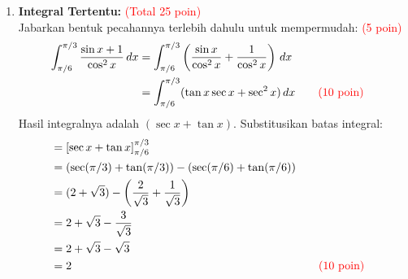 ﻿\documentclass[a4paper,12pt]{article}
\begin{document}
\begin{enumerate}
  \item \textbf{Integral Tertentu:} \textcolor{red}{(Total 25 poin)}\\
        Jabarkan bentuk pecahannya terlebih dahulu untuk mempermudah: \textcolor{red}{(5 poin)}
        \begin{align*}
          \int_{\pi/6}^{\pi/3} \frac{\sin x + 1}{\cos^2 x}\,dx & = \int_{\pi/6}^{\pi/3} \left( \frac{\sin x}{\cos^2 x} + \frac{1}{\cos^2 x} \right)\,dx                                               \\
                                                               & = \int_{\pi/6}^{\pi/3} (\tan x \sec x + \sec^2 x)\,dx                                  &  & \textcolor{red}{\quad (10 \text{ poin})}
        \end{align*}
        Hasil integralnya adalah $(\sec x + \tan x)$. Substitusikan batas integral:
        \begin{align*}
           & = \left[ \sec x + \tan x \right]_{\pi/6}^{\pi/3}                                                                        \\
           & = (\sec(\pi/3) + \tan(\pi/3)) - (\sec(\pi/6) + \tan(\pi/6))                                                             \\
           & = (2 + \sqrt{3}) - \left( \frac{2}{\sqrt{3}} + \frac{1}{\sqrt{3}} \right)                                               \\
           & = 2 + \sqrt{3} - \frac{3}{\sqrt{3}}                                                                                     \\
           & = 2 + \sqrt{3} - \sqrt{3}                                                                                               \\
           & = 2                                                                       &  & \textcolor{red}{\quad (10 \text{ poin})}
        \end{align*}
\end{enumerate}
\end{document}
